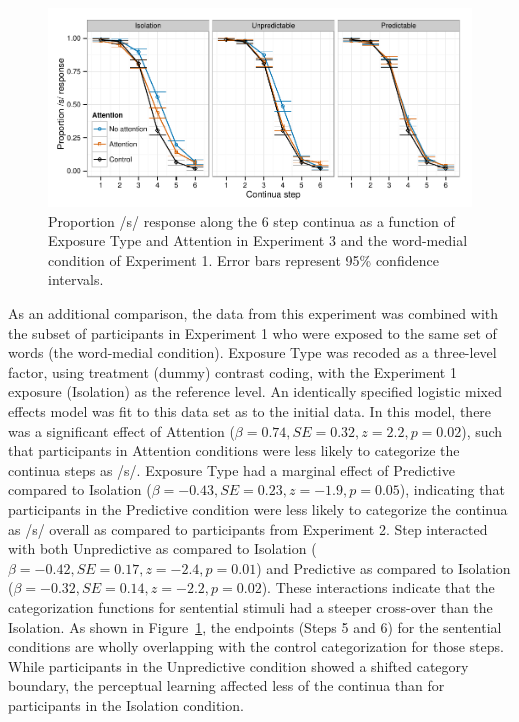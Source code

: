 \begin{figure}[!ht]
\caption{Proportion /s/ response along the 6 step continua as a function of Exposure Type and Attention in Experiment 3 and the word-medial condition of Experiment 1.  Error bars represent 95\% confidence intervals.}
\label{fig:exp23categ}
\begin{center}
\includegraphics[width=\textwidth]{graphs/exp23_categresults}
\end{center}
\end{figure}


As an additional comparison, the data from this experiment was combined with the subset of participants in Experiment 1 who were exposed to the same set of words (the word-medial condition).  
Exposure Type was recoded as a three-level factor, using treatment (dummy) contrast coding, with the Experiment 1 exposure (Isolation) as the reference level. 
An identically specified logistic mixed effects model was fit to this data set as to the initial data.  
In this model, there was a significant effect of Attention ($\beta = 0.74, SE = 0.32, z = 2.2, p = 0.02$), such that participants in Attention conditions were less likely to categorize the continua steps as /s/.  
Exposure Type had a marginal effect of Predictive compared to Isolation ($\beta = -0.43, SE = 0.23, z = -1.9, p = 0.05$), indicating that participants in the Predictive condition were less likely to categorize the continua as /s/ overall as compared to participants from Experiment 2. 
Step interacted with both Unpredictive as compared to Isolation ($\beta = -0.42, SE = 0.17, z = -2.4, p = 0.01$) and Predictive as compared to Isolation ($\beta = -0.32, SE = 0.14, z = -2.2, p = 0.02$).
These interactions indicate that the categorization functions for sentential stimuli had a steeper cross-over than the Isolation. 
As shown in Figure~\ref{fig:exp23categ}, the endpoints (Steps 5 and 6) for the sentential conditions are wholly overlapping with the control categorization for those steps.
While participants in the Unpredictive condition showed a shifted category boundary, the perceptual learning affected less of the continua than for participants in the Isolation condition.

